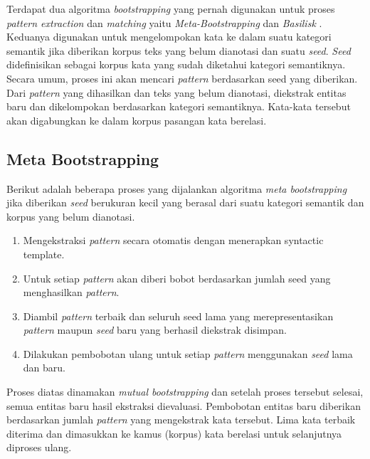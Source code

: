 Terdapat dua algoritma \textit{bootstrapping} yang pernah digunakan untuk proses \textit{pattern extraction} dan \textit{matching} yaitu \textit{Meta-Bootstrapping} dan \textit{Basilisk} \citep{riloff2003learning}. Keduanya digunakan untuk mengelompokan kata ke dalam suatu kategori semantik jika diberikan korpus teks yang belum dianotasi dan suatu \textit{seed}. \textit{Seed} didefinisikan sebagai korpus kata yang sudah diketahui kategori semantiknya. Secara umum, proses ini akan mencari \textit{pattern} berdasarkan seed yang diberikan. Dari \textit{pattern} yang dihasilkan dan teks yang belum dianotasi, diekstrak entitas baru dan dikelompokan berdasarkan kategori semantiknya. Kata-kata tersebut akan digabungkan ke dalam korpus pasangan kata berelasi.

\subsection{Meta Bootstrapping}
Berikut adalah beberapa proses \citep{riloff1999learning} yang dijalankan algoritma \textit{meta bootstrapping} jika diberikan \textit{seed} berukuran kecil yang berasal dari suatu kategori semantik dan korpus yang belum dianotasi.
\begin{enumerate}
  \item Mengekstraksi \textit{pattern} secara otomatis dengan menerapkan syntactic template.
  \item Untuk setiap \textit{pattern} akan diberi bobot berdasarkan jumlah seed yang menghasilkan \textit{pattern}.
  \item Diambil \textit{pattern} terbaik dan seluruh seed lama yang merepresentasikan \textit{pattern} maupun \textit{seed} baru yang berhasil diekstrak disimpan.
  \item Dilakukan pembobotan ulang untuk setiap \textit{pattern} menggunakan \textit{seed} lama dan baru.
\end{enumerate}

Proses diatas dinamakan \textit{mutual bootstrapping} dan setelah proses tersebut selesai, semua entitas baru hasil ekstraksi dievaluasi. Pembobotan entitas baru diberikan berdasarkan jumlah \textit{pattern} yang mengekstrak kata tersebut. Lima kata terbaik diterima dan dimasukkan ke kamus (korpus) kata berelasi untuk selanjutnya diproses ulang.

